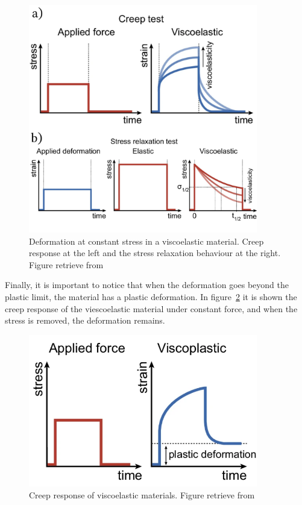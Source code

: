 \begin{figure}[ht!]
    \centering
    \centering
    \includegraphics[width=10cm]{figs/mechResponse/viscoElasticResponse-2.png}
    \caption{Deformation at constant stress in a viscoelastic material.
        Creep response at the left and the stress relaxation behaviour at the right.
        Figure retrieve from\citep{petelinsekToughHydrogelsLoadBearing2024}}\label{fig:mechresponse0-b}
\end{figure}

Finally, it is important to notice that when the deformation goes beyond the plastic limit, the material has a plastic deformation.
In figure~\ref{fig:mechresponse0-c} it is shown the creep response of the viescoelastic material under constant force, and when the stress is removed, the deformation remains.

\begin{figure}[ht!]
    \centering
    \centering
    \includegraphics[width=10cm]{figs/mechResponse/viscoElasticResponse-3.png}
    \caption{Creep response of viscoelastic materials. 
        Figure retrieve from\citep{courbotRoleExtracellularMatrix2025}}\label{fig:mechresponse0-c}
\end{figure}

